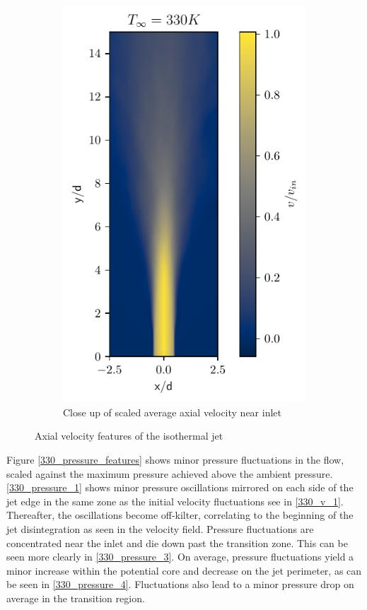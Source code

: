 \begin{figure}[htbp!]
\begin{subfigure}{0.25\textwidth}
	\includegraphics[scale=.65]{figures/Plots/vertical/330/v_scaled_vert_avg_330_zoom.pdf}
	\caption{Close up of scaled average axial velocity near inlet} \label{330_v_4}
\end{subfigure}
\caption{Axial velocity features of the isothermal jet}
\label{330_v_features}
\end{figure}

Figure \ref{330_pressure_features} shows minor pressure fluctuations in the flow, scaled against the maximum pressure achieved above the ambient pressure. \ref{330_pressure_1} shows minor pressure oscillations mirrored on each side of the jet edge in the same zone as the initial velocity fluctuations see in \ref{330_v_1}. Thereafter, the oscillations become off-kilter, correlating to the beginning of the jet disintegration as seen in the velocity field. Pressure fluctuations are concentrated near the inlet and die down past the transition zone. This can be seen more clearly in \ref{330_pressure_3}. On average, pressure fluctuations yield a minor increase within the potential core and decrease on the jet perimeter, as can be seen in \ref{330_pressure_4}. Fluctuations also lead to a minor pressure drop on average in the transition region.  

